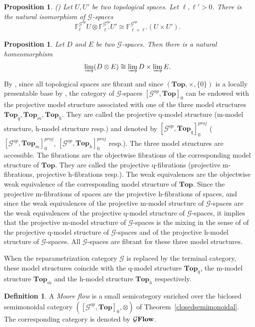 \documentclass[a4paper,12pt]{amsart}
\newcommand{\p}{\times}
\newtheorem{prop}[thm]{Proposition}
\newcommand{\bp}{\begin{prop}}
\newcommand{\ep}{\end{prop}}
\theoremstyle{definition}
\newtheorem{defn}[thm]{Definition}
\newcommand{\bd}{\begin{defn}}
\newcommand{\ed}{\end{defn}}
\renewcommand{\top}{{\mathbf{Top}}}
\newcommand{\iso}{\cong}
\newcommand{\ot}{\otimes}
\newcommand{\brm}[1]{{\rm{\mathbf{#1}}}}
\newcommand{\dtopG}{{\mathcal{G}\brm{Flow}}}
\newcommand{\topdgr}{[\mathcal{G}^{op},\top]}
\newcommand{\topdgrq}{[\mathcal{G}^{op},\top_q]_0^{proj}}
\newcommand{\topdgrm}{[\mathcal{G}^{op},\top_m]_0^{proj}}
\newcommand{\topdgrh}{[\mathcal{G}^{op},\top_h]_0^{proj}}
\newcommand{\liminj}{\varinjlim}
\begin{document}
\bp \label{Ftenseur} (\cite[Proposition~5.16]{Moore1})
Let $U,U'$ be two topological spaces. Let $\ell,\ell'>0$. There is the natural isomorphism of $\mathcal{G}$-spaces 
\[
\mathbb{F}^{\mathcal{G}^{op}}_{\ell}U \ot \mathbb{F}^{\mathcal{G}^{op}}_{\ell'}U' \iso \mathbb{F}^{\mathcal{G}^{op}}_{\ell+\ell'}(U\p U').
\]
\ep

\bp \label{tensor-product} \cite[Proposition~5.18]{Moore1}
Let $D$ and $E$ be two $\mathcal{G}$-spaces. Then there is a natural homeomorphism 
\[
\liminj (D \ot E) \iso \liminj D \p \liminj E.
\]
\ep


By \cite[Theorem~6.5(ii)]{MoserLyne}, since all topological spaces are fibrant and since $(\top,\p,\{0\})$ is a locally presentable base by \cite[Corollary~3.3]{dgrtop}, the category of $\mathcal{G}$-spaces $\topdgr_0$ can be endowed with the projective model structure associated with one of the three model structures $\top_q,\top_m,\top_h$. They are called the projective q-model structure (m-model structure, h-model structure resp.) and denoted by $\topdgrq$ ($\topdgrm$, $\topdgrh$ resp.). The three model structures are accessible. The fibrations are the objectwise fibrations of the corresponding model structure of $\top$. They are called the projective q-fibrations (projective m-fibrations, projective h-fibrations resp.). The weak equivalences are the objectwise weak equivalence of the corresponding model structure of $\top$. Since the projective m-fibrations of spaces are the projective h-fibrations of spaces, and since the weak equivalences of the projective m-model structure of $\mathcal{G}$-spaces are the weak equivalences of the projective q-model structure of $\mathcal{G}$-spaces, it implies that the projective m-model structure of $\mathcal{G}$-spaces is the mixing in the sense of \cite[Theorem~2.1]{mixed-cole} of the projective q-model structure of $\mathcal{G}$-spaces and of the projective h-model structure of $\mathcal{G}$-spaces. All $\mathcal{G}$-spaces are fibrant for these three model structures. 

When the reparametrization category $\mathcal{G}$ is replaced by the terminal category, these model structures coincide with the q-model structure $\top_q$, the m-model structure $\top_m$ and the h-model structure $\top_h$ respectively.

\bd \cite[Definition~6.2]{Moore1} \label{def-Moore-flow}
A \textit{Moore flow} is a small semicategory enriched over the biclosed semimonoidal category $(\topdgr_0,\ot)$ of Theorem~\ref{closedsemimonoidal}. The corresponding category is denoted by $\dtopG$. 
\ed
\end{document}
